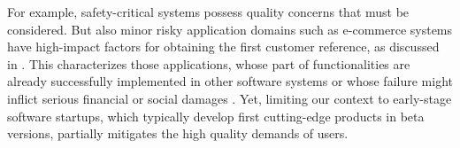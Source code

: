 \documentclass[10pt,journal,letterpaper,compsoc]{IEEEtran}
\begin{document}
For example, safety-critical systems possess quality concerns that must be 
considered. But also minor risky application domains such as e-commerce systems 
have high-impact factors for obtaining the first customer reference, %
as discussed in \cite{Deakins2005,Kim2005,Silva2005}. This %
characterizes those applications, whose part of functionalities are already 
successfully implemented in other software systems or whose failure might 
inflict serious financial or social damages \cite{Bass2003}. Yet, limiting our 
context to early-stage software startups, which typically develop first 
cutting-edge products in beta versions, partially mitigates the high quality 
demands of users.
\end{document}
